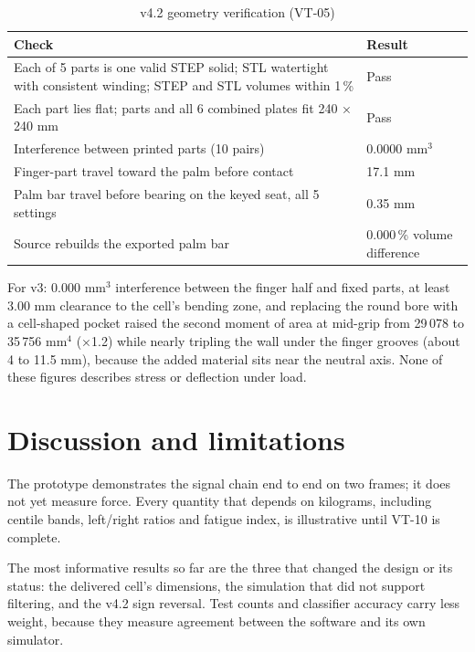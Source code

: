 \documentclass[10pt,a4paper]{article}
\begin{document}
\begin{table}[H]
\centering\small
\caption{v4.2 geometry verification (VT-05)}
\begin{tabularx}{\linewidth}{@{}LP{5cm}@{}}
\toprule
Check & Result \\
\midrule
Each of 5 parts is one valid STEP solid; STL watertight with consistent winding; STEP and STL volumes within 1\,\% & Pass \\
Each part lies flat; parts and all 6 combined plates fit 240 × 240 mm & Pass \\
Interference between printed parts (10 pairs) & 0.0000 mm$^3$ \\
Finger-part travel toward the palm before contact & 17.1 mm \\
Palm bar travel before bearing on the keyed seat, all 5 settings & 0.35 mm \\
Source rebuilds the exported palm bar & 0.000\,\% volume difference \\
\bottomrule
\end{tabularx}
\end{table}

For v3: 0.000 mm$^3$ interference between the finger half and fixed parts, at least 3.00 mm clearance to the cell's bending zone, and replacing the round bore with a cell-shaped pocket raised the second moment of area at mid-grip from 29\,078 to 35\,756 mm$^4$ (×1.2) while nearly tripling the wall under the finger grooves (about 4 to 11.5 mm), because the added material sits near the neutral axis. None of these figures describes stress or deflection under load.

\section{Discussion and limitations}

The prototype demonstrates the signal chain end to end on two frames; it does not yet measure force. Every quantity that depends on kilograms, including centile bands, left/right ratios and fatigue index, is illustrative until VT-10 is complete.

The most informative results so far are the three that changed the design or its status: the delivered cell's dimensions, the simulation that did not support filtering, and the v4.2 sign reversal. Test counts and classifier accuracy carry less weight, because they measure agreement between the software and its own simulator.
\end{document}
